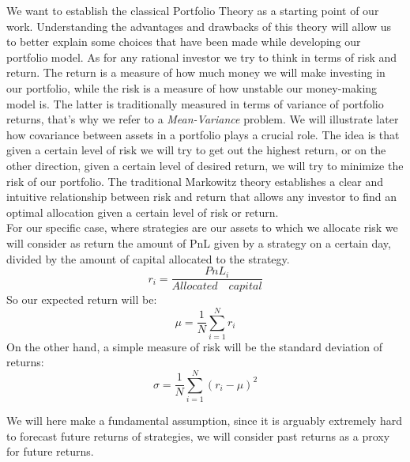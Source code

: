 We want to establish the classical Portfolio Theory as a starting point of our work. Understanding the advantages and drawbacks of this theory will allow us to better explain some choices that have been made while developing our portfolio model. As for any rational investor we try to think in terms of risk and return. The return is a measure of how much money we will make investing in our portfolio, while the risk is a measure of how unstable our money-making model is. The latter is traditionally measured in terms of variance of portfolio returns, that's why we refer to a \textit{Mean-Variance} problem. We will illustrate later how covariance between assets in a portfolio plays a crucial role. The idea is that given a certain level of risk we will try to get out the highest return, or on the other direction, given a certain level of desired return, we will try to minimize the risk of our portfolio. The traditional Markowitz theory establishes a clear and intuitive relationship between risk and return that allows any investor to find an optimal allocation given a certain level of risk or return.\\
For our specific case, where strategies are our assets to which we allocate risk we will consider as return the amount of PnL given by a strategy on a certain day, divided by the amount of capital allocated to the strategy.
$$
r_i = \frac{PnL_i}{Allocated \quad capital}
$$
So our expected return will be:
$$
\mu = \frac{1}{N}\sum\limits_{i=1}^N r_i
$$
On the other hand, a simple measure of risk will be the standard deviation of returns:
$$
\sigma = \frac{1}{N}\sum\limits_{i=1}^N (r_i - \mu)^2
$$

We will here make a fundamental assumption, since it is arguably extremely hard to forecast future returns of strategies, we will consider past returns as a proxy for future returns.\\